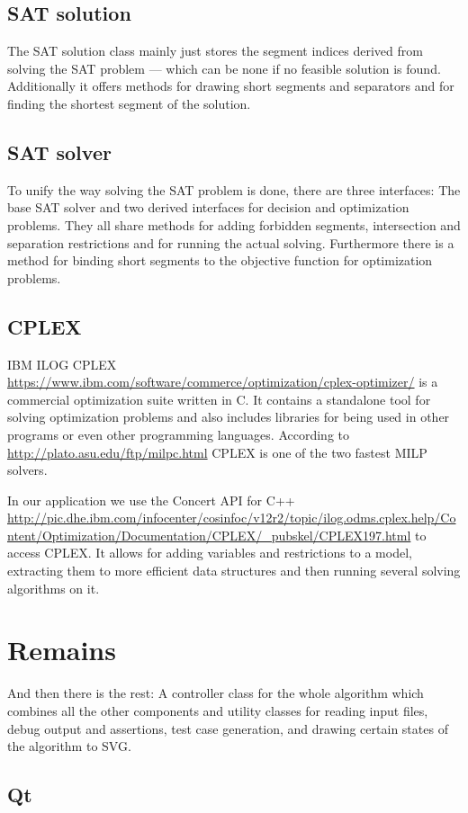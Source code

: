 \subsection{SAT solution}
The SAT solution class mainly just stores the segment indices derived
from solving the SAT problem --- which can be none if no feasible
solution is found. Additionally it offers methods for drawing short
segments and separators and for finding the shortest segment of the
solution.

\subsection{SAT solver}
To unify the way solving the SAT problem is done, there are three
interfaces: The base SAT solver and two derived interfaces for
decision and optimization problems. They all share methods for adding
forbidden segments, intersection and separation restrictions and for
running the actual solving. Furthermore there is a method for binding
short segments to the objective function for optimization problems.

\subsection{CPLEX}
IBM ILOG CPLEX
\url{https://www.ibm.com/software/commerce/optimization/cplex-optimizer/}
is a commercial optimization suite written in C. It contains a
standalone tool for solving optimization problems and also includes
libraries for being used in other programs or even other programming
languages. According to 
\url{http://plato.asu.edu/ftp/milpc.html} 
CPLEX is one of the two fastest MILP solvers.

In our application we use the Concert API for C++
\url{http://pic.dhe.ibm.com/infocenter/cosinfoc/v12r2/topic/ilog.odms.cplex.help/Content/Optimization/Documentation/CPLEX/_pubskel/CPLEX197.html}
to access CPLEX. It allows for adding variables and restrictions to
a model, extracting them to more efficient data structures and then
running several solving algorithms on it.

\section{Remains}
And then there is the rest: A controller
class for the whole algorithm which combines all the other components
and utility classes for reading input files, debug
output and assertions, test case generation, and drawing certain 
states of the algorithm to SVG.

\subsection{Qt}\label{sec:Qt}
